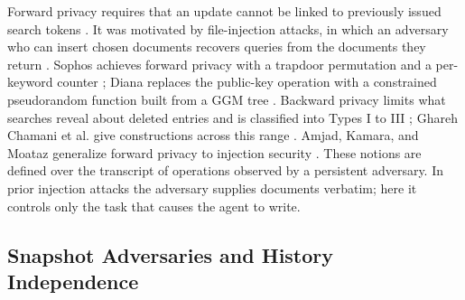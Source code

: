 Forward privacy requires that an update cannot be linked to previously issued search tokens
\cite{stefanov2014practical,bost2016sophos}. It was motivated by file-injection attacks, in which
an adversary who can insert chosen documents recovers queries from the documents they return
\cite{zhang2016all}. Sophos achieves forward privacy with a trapdoor permutation and a per-keyword
counter \cite{bost2016sophos}; Diana replaces the public-key operation with a constrained
pseudorandom function built from a GGM tree \cite{bost2017forward}. Backward privacy limits what
searches reveal about deleted entries and is classified into Types I to III
\cite{bost2017forward}; Ghareh Chamani et al. give constructions across this range
\cite{chamani2018new}. Amjad, Kamara, and Moataz generalize forward privacy to injection security
\cite{amjad2023injection}. These notions are defined over the transcript of operations observed
by a persistent adversary. In prior injection attacks the adversary supplies documents verbatim;
here it controls only the task that causes the agent to write.

\subsection{Snapshot Adversaries and History Independence}

